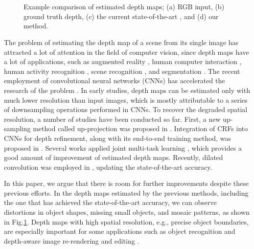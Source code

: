 \documentclass[10pt,twocolumn,letterpaper]{article}
\begin{document}
\begin{figure}[t]
\centering
{}
~ \\
~
\caption{Example comparison of estimated depth maps; (a) RGB input, (b) ground truth depth, (c) the current state-of-the-art \cite{fu2018deep}, and (d) our method.}
\label{fig_one}
\end{figure}

The problem of estimating the depth map of a scene from its single image has attracted a lot of attention in the field of computer vision, since depth maps have a lot of applications, 
such as augmented reality \cite{lee2011depth}, human computer interaction \cite{Ren2011DepthCB}, human activity recognition \cite{Gupta2013HumanAR}, scene recognition \cite{zia2017rgb}, and segmentation \cite{Lu2018CurveStructureSF,qi2018geonet}. 
The recent employment of convolutional neural networks (CNNs) has accelerated the research of the problem \cite{Eigen2014depth,liu2015deep,Li2015DepthAS,cao2017estimating,chen2016single}. In early studies, depth maps can be estimated only with much lower resolution than input images, which is mostly attributable to a series of downsampling operations performed in CNNs. 
To recover the degraded spatial resolution, a number of studies have been conducted so far. First, a new up-sampling method called up-projection was proposed in \cite{laina2016deeper}. Integration of CRFs into CNNs for depth refinement, along with its end-to-end training method, was proposed in \cite{Xu2017MultiscaleCC}. Several works applied joint multi-task learning \cite{Eigen2015PredictingDS,Dharmasiri2017JointPO}, which provides a good amount of improvement of estimated depth maps.
Recently, dilated convolution was employed in \cite{fu2018deep}, updating the state-of-the-art accuracy. 

In this paper, we argue that  there is room for further improvements despite these previous efforts. In the depth maps estimated by the previous methods, including the one that has achieved the state-of-the-art accuracy, we can observe distortions in object shapes, missing small objects, and mosaic patterns, as shown in Fig.\ref{fig_one}. Depth maps with high spatial resolution, e.g., precise object boundaries, are especially important for some applications such as object recognition \cite{song2017depth} and depth-aware image re-rendering and editing \cite{li2017two}. 
\end{document}
